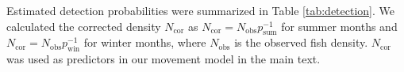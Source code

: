 \documentclass[11pt, class=article, crop=false]{standalone}
\begin{document}
Estimated detection probabilities were summarized in Table \ref{tab:detection}. We calculated the corrected density $N_{\text{cor}}$ as $N_{\text{cor}} = N_{\text{obs}}p_{\text{sum}}^{-1}$ for summer months and $N_{\text{cor}} = N_{\text{obs}}p_{\text{win}}^{-1}$ for winter months, where $N_{\text{obs}}$ is the observed fish density. $N_{\text{cor}}$ was used as predictors in our movement model in the main text.

\newpage




\end{document}
